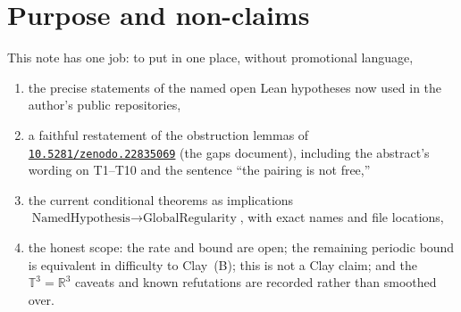 \documentclass[11pt]{article}
\theoremstyle{plain}
\theoremstyle{definition}
\theoremstyle{remark}
\newcommand{\Tthree}{\mathbb{T}^{3}}
\newcommand{\R}{\mathbb{R}}
\newcommand{\doi}[1]{\href{https://doi.org/#1}{\texttt{#1}}}
\begin{document}
\begin{abstract}
New in this version: (a)~every Lean citation is re-pinned to a current commit whose continuous integration passed, with line numbers re-checked; (b)~the Lean libraries cited here contain no \texttt{sorry}, \texttt{admit}, \texttt{native\_decide}, or \texttt{axiom} declaration in any built module (counts in \S\ref{sec:repro}); (c)~a kernel axiom certificate, produced by \texttt{\#print axioms} for every cited declaration, shows only \texttt{propext}, \texttt{Classical.choice}, and \texttt{Quot.sound}; (d)~a status table for T1--T10 (\S\ref{sec:status}) states, item by item, what is formalized and what is open. No T-item is closed. This version also cites the conditional Fefferman reduction paper \doi{10.5281/zenodo.24152113}.
\end{abstract}

\noindent
{}

\tableofcontents
\newpage

\section{Purpose and non-claims}

This note has one job: to put in one place, without promotional language,
\begin{enumerate}[leftmargin=1.4em]
\item the precise statements of the named open Lean hypotheses now used in the author's public repositories,
\item a faithful restatement of the obstruction lemmas of \doi{10.5281/zenodo.22835069} (the gaps document), including the abstract's wording on T1--T10 and the sentence ``the pairing is not free,''
\item the current conditional theorems as implications \(\text{NamedHypothesis}\to\text{GlobalRegularity}\), with exact names and file locations,
\item the honest scope: the rate and bound are open; the remaining periodic bound is equivalent in difficulty to Clay~(B); this is not a Clay claim; and the \(\Tthree=\R^{3}\) caveats and known refutations are recorded rather than smoothed over.
\end{enumerate}
\end{document}
